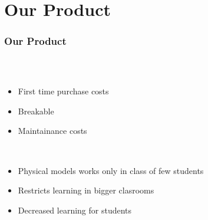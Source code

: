 \section{Our Product}

\begin{frame}
  \frametitle{Our Product}
   \begin{columns}
    \begin{column}{0.8\textwidth}
      \begin{description}[]
        \item[What is it?] \hfill \\
        \begin{itemize}
          \item First time purchase costs
          \item Breakable
          \item Maintainance costs
        \end{itemize}

        \bigskip
        \item[Key features ] \hfill \\
          \begin{itemize}
            \item Physical models works only in class of few students
            \item Restricts learning in bigger clasrooms
            \item Decreased learning for students
        \end{itemize}
      \end{description}
    \end{column}


\end{columns}
\end{frame}
